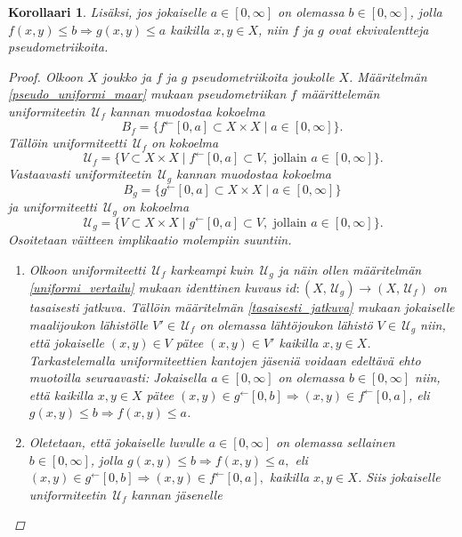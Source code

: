 \documentclass[12pt,a4paper,leqno]{report}
\newcommand{\U}{\,\mathcal{U}}
\theoremstyle{plain}
\newtheorem{kor}[equation]{Korollaari}
\theoremstyle{definition}
\theoremstyle{remark}
\begin{document}
\begin{kor}
Lisäksi, jos jokaiselle $a\in[0,\infty]$ on olemassa $b\in[0,\infty]$, jolla $f(x,y)\leq b \Rightarrow g(x,y)\leq a$ kaikilla $x,y\in X$, niin $f$ ja $g$ ovat ekvivalentteja pseudometriikoita.
\begin{proof}
Olkoon $X$ joukko ja $f$ ja $g$ pseudometriikoita joukolle $X$. 
Määritelmän \ref{pseudo_uniformi_maar} mukaan pseudometriikan $f$ määrittelemän uniformiteetin $\U_f$ kannan muodostaa kokoelma 
$$B_f=\{ f^{\leftarrow}[0,a]\subset X\times X\mid a\in[0,\infty]\}.$$ 
Tällöin uniformiteetti $ \U_f$ on kokoelma 
$$\U_f=\{ V\subset X\times X\mid f^{\leftarrow}[0,a]\subset V, \text{ jollain } a\in[0,\infty]\}.$$
Vastaavasti uniformiteetin $\U_g$ kannan muodostaa kokoelma $$B_g=\{ g^{\leftarrow}[0,a]\subset X\times X\mid a\in[0,\infty]\}$$ ja uniformiteetti $ \U_g$ on kokoelma 
$$\U_g=\{ V\subset X\times X\mid g^{\leftarrow}[0,a]\subset V, \text{ jollain } a\in[0,\infty]\}.$$ 
Osoitetaan väitteen implikaatio molempiin suuntiin.
\begin{enumerate}
\item[$\Rightarrow$] 
Olkoon uniformiteetti $\U_f$ karkeampi kuin $\U_g$ ja näin ollen määritelmän \ref{uniformi_vertailu} mukaan identtinen kuvaus $id\colon(X,\U_g)\rightarrow(X,\U_f)$ on tasaisesti jatkuva. 
Tällöin määritelmän \ref{tasaisesti_jatkuva} 
mukaan jokaiselle maalijoukon %
lähistölle $V'\in\U_f $ on olemassa %
lähtöjoukon lähistö $V\in\U_g $ niin, että 
jokaiselle $(x,y)\in V$ pätee $(x,y)\in V'$ kaikilla $x,y\in X$. 
Tarkas\-tele\-mal\-la uniformiteettien kantojen jäseniä 
voidaan edeltävä ehto muotoilla seuraavasti: 
Jokaisella $a\in[0,\infty]$ on olemassa $b\in[0,\infty]$ niin, 
että kaikilla $x,y\in X$ pätee 
$(x,y)\in g^{\leftarrow}[0,b]\Rightarrow (x,y)\in f^{\leftarrow}[0,a]$, 
eli $g(x,y)\leq b\Rightarrow f(x,y) \leq a$.
\item[$\Leftarrow$] Oletetaan, että jokaiselle luvulle 
$a\in[0,\infty]$ on olemassa sellainen $b\in[0,\infty]$, jolla 
$g(x,y)\leq b \Rightarrow f(x,y)\leq a,
$ %
eli %
$(x,y)\in g^{\leftarrow}[0,b]\Rightarrow (x,y)\in f^{\leftarrow}[0,a],$ 
kaikilla $x,y\in X$. 
Siis jokaiselle uniformiteetin $\U_f$ kannan jäsenelle 

\end{enumerate}
\end{proof}
\end{kor}
\end{document}
